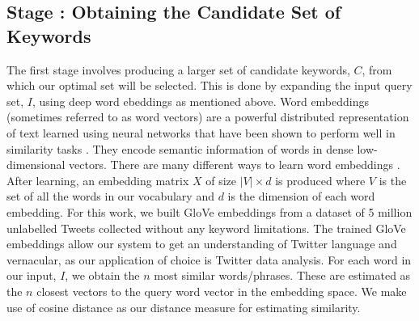 \documentclass[runningheads]{llncs}
\newcommand{\RNum}[1]{\uppercase\expandafter{\romannumeral #1\relax}}
\begin{document}
\subsection{Stage \RNum{1}: Obtaining the Candidate Set of Keywords}
The first stage involves producing a larger set of candidate keywords, $C$, from which our optimal set will be selected. This is done by expanding the input query set, $I$, using deep word ebeddings as mentioned above. Word embeddings (sometimes referred to as word vectors) are a powerful distributed representation of text learned using neural networks that have been shown to perform well in similarity tasks \cite{REF19}. They encode semantic information of words in dense low-dimensional vectors. There are many different ways to learn word embeddings \cite{REF13,REF14,REF15}. After learning, an embedding matrix $X$ of size $|V| \times d$ is produced where $V$  is the set of all the words in our vocabulary and $d$ is the dimension of each word embedding. For this work, we built GloVe embeddings \cite{REF13} from a dataset of 5 million unlabelled Tweets collected without any keyword limitations. The trained GloVe embeddings allow our system to get an understanding of Twitter language and vernacular, as our application of choice is Twitter data analysis. For each word in our input, $I$, we obtain the $n$ most similar words/phrases. These are estimated as the $n$ closest vectors to the query word vector in the embedding space. We make use of cosine distance as our distance measure for estimating similarity. 
\end{document}
